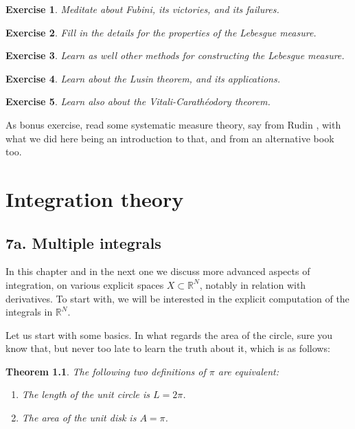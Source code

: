 \documentclass[12pt]{amsbook}
\newtheorem{theorem}{Theorem}[chapter]
\newtheorem{exercise}[theorem]{Exercise}
\begin{document}
\begin{exercise}
Meditate about Fubini, its victories, and its failures.
\end{exercise}

\begin{exercise}
Fill in the details for the properties of the Lebesgue measure.
\end{exercise}

\begin{exercise}
Learn as well other methods for constructing the Lebesgue measure. 
\end{exercise}

\begin{exercise}
Learn about the Lusin theorem, and its applications.
\end{exercise}

\begin{exercise}
Learn also about the Vitali-Carath\'eodory theorem.
\end{exercise}

As bonus exercise, read some systematic measure theory, say from Rudin \cite{ru2}, with what we did here being an introduction to that, and from an alternative book too.

\chapter{Integration theory}

\section*{7a. Multiple integrals}

In this chapter and in the next one we discuss more advanced aspects of integration, on various explicit spaces $X\subset\mathbb R^N$, notably in relation with derivatives. To start with, we will be interested in the explicit computation of the integrals in $\mathbb R^N$.

\bigskip

Let us start with some basics. In what regards the area of the circle, sure you know that, but never too late to learn the truth about it, which is as follows:

\begin{theorem}
The following two definitions of $\pi$ are equivalent:
\begin{enumerate}
\item The length of the unit circle is $L=2\pi$.

\item The area of the unit disk is $A=\pi$.
\end{enumerate}
\end{theorem}
\end{document}
